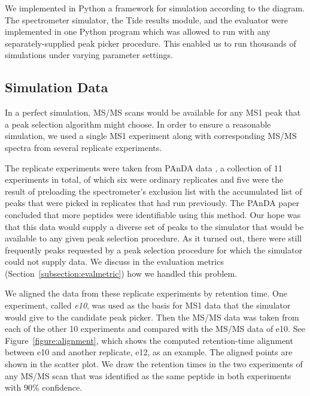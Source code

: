 \documentclass[12pt,twoside,openright]{report}
\begin{document}
We implemented in Python a framework for simulation according to the
diagram. The spectrometer simulator, the Tide results module, and the evaluator
were implemented in one Python program which was allowed to run with any
separately-supplied peak picker procedure. This enabled us to run thousands of
simulations under varying parameter settings.

\subsection{Simulation Data} %
\label{subsection:simulationdata}

In a perfect simulation, MS/MS scans would be available for any MS1 peak that a
peak selection algorithm might choose. In order to ensure a reasonable
simulation, we used a single MS1 experiment along with corresponding MS/MS
spectra from several replicate experiments.

The replicate experiments were taken from PAnDA data \cite{hoopmann:post}, a
collection of 11 experiments in total, of which six were ordinary replicates and
five were the result of preloading the spectrometer's exclusion list with the
accumulated list of peaks that were picked in replicates that had run
previously. The PAnDA paper concluded that more peptides were identifiable using
this method. Our hope was that this data would supply a diverse set of peaks to
the simulator that would be available to any given peak selection procedure. As
it turned out, there were still frequently peaks requested by a peak selection
procedure for which the simulator could not supply data. We discuss in the
evaluation metrics (Section~\ref{subsection:evalmetric}) how we handled this
problem.

We aligned the data from these replicate experiments by retention time. One
experiment, called {\it e10}, was used as the basis for MS1 data that the
simulator would give to the candidate peak picker. Then the MS/MS data was
taken from each of the other 10 experiments and compared with the MS/MS data of
e10. See Figure~\ref{figure:alignment}, which shows the computed retention-time
alignment between e10 and another replicate, e12, as an example. The aligned
points are shown in the scatter plot. We draw the retention times in the two
experiments of any MS/MS scan that was identified as the same peptide in both
experiments with 90\% confidence.
\end{document}
